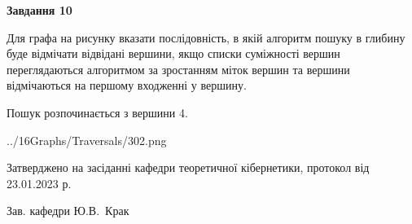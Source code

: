 \documentclass[12pt, ukrainian]{article}
\begin{document}
{\begin {large}
{\begin {center}\textbf{Завдання 10}\end {center}}\par
Для графа на рисунку вказати послідовність, в якій алгоритм пошуку в глибину буде відмічати відвідані вершини, якщо списки суміжності вершин переглядаються алгоритмом за зростанням міток вершин та вершини відмічаються на першому вход\-женні у вершину.\par
Пошук розпочинається з вершини 4.\par

\begin{center}
	{../16Graphs/Traversals/302.png}
\end{center}\par
\newpage


\end {large}
}
{\smallskip \begin {small} Затверджено на засіданні кафедри теоретичної кібернетики, протокол  від   23.01.2023 р.\par\smallskip\smallskip
{\parbox {6.5 cm}{Зав. кафедри \dotfill Ю.В.~Крак}} \end{small}}
\end{document}
